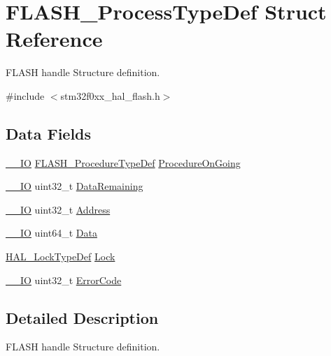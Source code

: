 \hypertarget{struct_f_l_a_s_h___process_type_def}{}\section{F\+L\+A\+S\+H\+\_\+\+Process\+Type\+Def Struct Reference}
\label{struct_f_l_a_s_h___process_type_def}


F\+L\+A\+SH handle Structure definition.  




{\ttfamily \#include $<$stm32f0xx\+\_\+hal\+\_\+flash.\+h$>$}

\subsection*{Data Fields}
\begin{DoxyCompactItemize}
\item 
\hyperlink{core__sc300_8h_aec43007d9998a0a0e01faede4133d6be}{\+\_\+\+\_\+\+IO} \hyperlink{group___f_l_a_s_h___exported___types_ga2b0268387bc11bcab76be9ce7c43eaaf}{F\+L\+A\+S\+H\+\_\+\+Procedure\+Type\+Def} \hyperlink{struct_f_l_a_s_h___process_type_def_a5e0516d2d3654cef74de4ed427c16d26}{Procedure\+On\+Going}
\item 
\hyperlink{core__sc300_8h_aec43007d9998a0a0e01faede4133d6be}{\+\_\+\+\_\+\+IO} uint32\+\_\+t \hyperlink{struct_f_l_a_s_h___process_type_def_a04975ac6f628743bfcd68da33d96cdee}{Data\+Remaining}
\item 
\hyperlink{core__sc300_8h_aec43007d9998a0a0e01faede4133d6be}{\+\_\+\+\_\+\+IO} uint32\+\_\+t \hyperlink{struct_f_l_a_s_h___process_type_def_a1cfe8c27be9a16679f15eda30081bd30}{Address}
\item 
\hyperlink{core__sc300_8h_aec43007d9998a0a0e01faede4133d6be}{\+\_\+\+\_\+\+IO} uint64\+\_\+t \hyperlink{struct_f_l_a_s_h___process_type_def_a59e6cefcc14b8810b8f48ae2785ed3fe}{Data}
\item 
\hyperlink{stm32f0xx__hal__def_8h_ab367482e943333a1299294eadaad284b}{H\+A\+L\+\_\+\+Lock\+Type\+Def} \hyperlink{struct_f_l_a_s_h___process_type_def_ad4cf225029dbefe8d3fe660c33b8bb6b}{Lock}
\item 
\hyperlink{core__sc300_8h_aec43007d9998a0a0e01faede4133d6be}{\+\_\+\+\_\+\+IO} uint32\+\_\+t \hyperlink{struct_f_l_a_s_h___process_type_def_a123c5063e6a3b1901b2fbe5f88c53a7e}{Error\+Code}
\end{DoxyCompactItemize}


\subsection{Detailed Description}
F\+L\+A\+SH handle Structure definition. 

